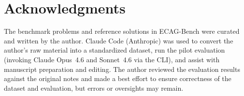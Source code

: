 \documentclass[11pt,a4paper]{article}
\begin{document}


\section*{Acknowledgments}

The benchmark problems and reference solutions in ECAG-Bench were curated and written by the author.
Claude Code (Anthropic) was used to convert the author's raw material into a standardized dataset, run the pilot evaluation (invoking Claude Opus~4.6 and Sonnet~4.6 via the CLI), and assist with manuscript preparation and editing.
The author reviewed the evaluation results against the original notes and made a best effort to ensure correctness of the dataset and evaluation, but errors or oversights may remain.










\appendix

\end{document}
